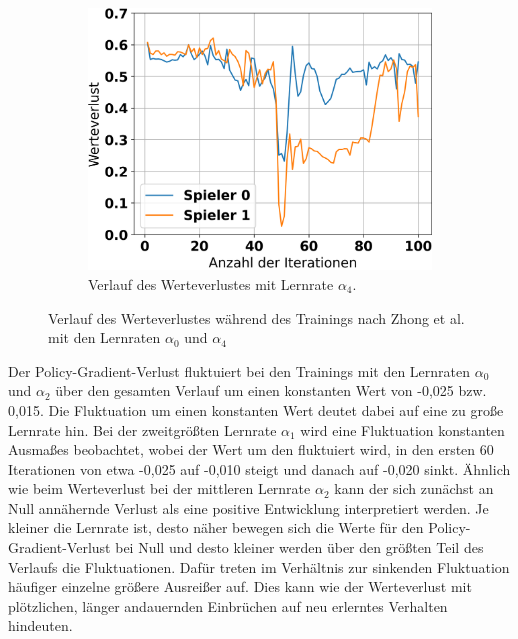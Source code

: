 \begin{figure}[ht!]
\begin{subfigure}[b]{0.32\textwidth}
		\includegraphics[width=\textwidth]{Bilder/ensemble-training/e_0_00001/graph_value_losses.png}
		\caption{Verlauf des Werteverlustes mit Lernrate $\alpha_4$.}
		\label{fig:f15}
	\end{subfigure}
	\caption{Verlauf des Werteverlustes während des Trainings nach Zhong et al. mit den Lernraten $\alpha_0$ und $\alpha_4$}
\end{figure}

Der Policy-Gradient-Verlust fluktuiert bei den Trainings mit den Lernraten $\alpha_0$ und $\alpha_2$ über den gesamten Verlauf um einen konstanten Wert von -0,025 bzw. 0,015. Die Fluktuation um einen konstanten Wert deutet dabei auf eine zu große Lernrate hin. Bei der zweitgrößten Lernrate $\alpha_1$ wird eine Fluktuation konstanten Ausmaßes beobachtet, wobei der Wert um den fluktuiert wird, in den ersten 60 Iterationen von etwa -0,025 auf -0,010 steigt und danach auf -0,020 sinkt. Ähnlich wie beim Werteverlust bei der mittleren Lernrate $\alpha_2$ kann der sich zunächst an Null annähernde Verlust als eine positive Entwicklung interpretiert werden. Je kleiner die Lernrate ist, desto näher bewegen sich die Werte für den Policy-Gradient-Verlust bei Null und desto kleiner werden über den größten Teil des Verlaufs die Fluktuationen. Dafür treten im Verhältnis zur sinkenden Fluktuation häufiger einzelne größere Ausreißer auf. Dies kann wie der Werteverlust mit plötzlichen, länger andauernden Einbrüchen auf neu erlerntes Verhalten hindeuten.

